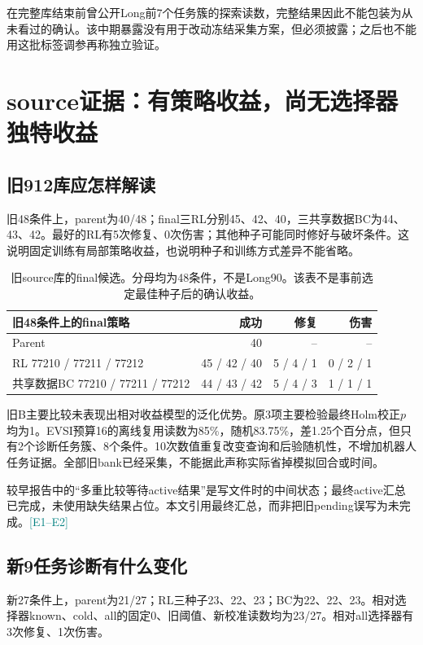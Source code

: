 \documentclass[UTF8,a4paper,fontset=none,zihao=-4]{ctexart}
\newcommand{\ev}[1]{\textcolor{teal}{\small[#1]}}
\begin{document}
在完整库结束前曾公开Long前7个任务簇的探索读数，完整结果因此不能包装为从未看过的确认。该中期暴露没有用于改动冻结采集方案，但必须披露；之后也不能用这批标签调参再称独立验证。
\section{source证据：有策略收益，尚无选择器独特收益}
\subsection{旧912库应怎样解读}
旧48条件上，parent为40/48；final三RL分别45、42、40，三共享数据BC为44、43、42。最好的RL有5次修复、0次伤害；其他种子可能同时修好与破坏条件。这说明固定训练有局部策略收益，也说明种子和训练方式差异不能省略。
\par
\begin{table}[htbp]\centering\small
\begin{tabular}{lrrr}\toprule
旧48条件上的final策略 & 成功 & 修复 & 伤害\\\midrule
Parent &40&--&--\\
RL 77210 / 77211 / 77212 &45 / 42 / 40&5 / 4 / 1&0 / 2 / 1\\
共享数据BC 77210 / 77211 / 77212 &44 / 43 / 42&5 / 4 / 3&1 / 1 / 1\\\bottomrule
\end{tabular}
\caption{旧source库的final候选。分母均为48条件，不是Long90。该表不是事前选定最佳种子后的确认收益。}
\end{table}
\par
旧B主要比较未表现出相对收益模型的泛化优势。原3项主要检验最终Holm校正$p$均为1。EVSI预算16的离线复用读数为85\%，随机83.75\%，差1.25个百分点，但只有2个诊断任务簇、8个条件。10次数值重复改变查询和后验随机性，不增加机器人任务证据。全部旧bank已经采集，不能据此声称实际省掉模拟回合或时间。

较早报告中的“多重比较等待active结果”是写文件时的中间状态；最终active汇总已完成，未使用缺失结果占位。本文引用最终汇总，而非把旧pending误写为未完成。\ev{E1--E2}
\subsection{新9任务诊断有什么变化}
新27条件上，parent为21/27；RL三种子23、22、23；BC为22、22、23。相对选择器known、cold、all的固定0、旧阈值、新校准读数均为23/27。相对all选择器有3次修复、1次伤害。
\end{document}
